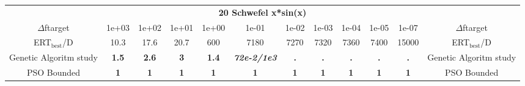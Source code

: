 \begin{tabular}{cccccccccccc}
 & \multicolumn{10}{c}{{\normalsize \textbf{20 Schwefel x*sin(x)}}}\\
$\Delta$ftarget& 1e+03& 1e+02& 1e+01& 1e+00& 1e-01& 1e-02& 1e-03& 1e-04& 1e-05& 1e-07 & $\Delta$ftarget \\
ERT$_{\textrm{best}}$/D& 10.3& 17.6& 20.7& 600& 7180& 7270& 7320& 7360& 7400& 15000 & ERT$_{\textrm{best}}$/D \\
\hline
Genetic Algoritm study & \textbf{1.5} & \textbf{2.6} & \textbf{3} & \textbf{1.4} & \textbf{\textit{72e-2}\textit{/1e3}} & \textbf{.} & \textbf{.} & \textbf{.} & \textbf{.} & \textbf{.} & Genetic Algoritm study \cite{add_an_entry_for_Genetic Algoritm study_in_bbob.bib}\\
PSO Bounded & \textbf{1} & \textbf{1} & \textbf{1} & \textbf{1} & \textbf{1} & \textbf{1} & \textbf{1} & \textbf{1} & \textbf{1} & \textbf{1} & PSO Bounded \cite{add_an_entry_for_PSO Bounded_in_bbob.bib}
\end{tabular}
